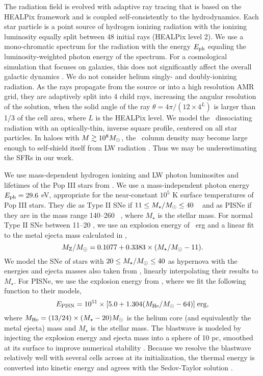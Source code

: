 \documentclass[apjl]{emulateapj}
\begin{document}
The radiation field is evolved with adaptive ray tracing
\citep{Abel02_RT, Wise11_Moray} that is based on the HEALPix framework
\citep{HEALPix} and is coupled self-consistently to the hydrodynamics.
Each star particle is a point source of hydrogen ionizing radiation
with the ionizing luminosity equally split between 48 initial rays
(HEALPix level 2).  We use a mono-chromatic spectrum for the radiation
with the energy $E_{\rm ph}$ equaling the luminosity-weighted photon
energy of the spectrum.  For a cosmological simulation that focuses on
galaxies, this does not significantly affect the overall galactic
dynamics \citep[see Sec. 6.3 in][]{Wise11_Moray}.  We do not consider helium
singly- and doubly-ionizing radiation.  As the rays propagate from the
source or into a high resolution AMR grid, they are adaptively split
into 4 child rays, increasing the angular resolution of the solution,
when the solid angle of the ray $\theta = 4\pi/(12 \times 4^{L})$ is
larger than 1/3 of the cell area, where $L$ is the HEALPix level.  We
model the \hh~dissociating radiation with an optically-thin, inverse
square profile, centered on all star particles.  In haloes with $M
\ga 10^8 \Ms$, the \hh~column density may become large enough to
self-shield itself from LW radiation \citep{Wise08_Gal}.  Thus we may
be underestimating the SFRs in our work.

We use mass-dependent hydrogen ionizing and LW photon luminosites and
lifetimes of the Pop III stars from \citet{Schaerer02}.  We use a
mass-independent photon energy $E_{\rm ph} = 29.6$ eV, appropriate for
the near-constant $10^5$ K surface temperatures of Pop III stars.
They die as Type II SNe if $11 \le M_\star/\Ms \le 40$
\Ms~\citep{Woosley95} and as PISNe if they are in the mass range
140--260 \Ms~\citep{Heger03}, where $M_\star$ is the stellar mass.
For normal Type II SNe between 11--20 \Ms, we use an explosion energy
of ~erg and a linear fit to the metal ejecta mass calculated
in \citet{Nomoto06},
%
\begin{equation}
  \label{eqn:typeii}
  M_{\rm Z}/\Ms = 0.1077 + 0.3383 \times (M_\star/\Ms - 11).
\end{equation}
%
We model the SNe of stars with $20 \le M_\star/\Ms \le 40$ as
hypernova with the energies and ejecta masses also taken from
\citeauthor{Nomoto06}, linearly interpolating their results to
$M_\star$.  For PISNe, we use the explosion energy from
\citet{Heger02}, where we fit the following function to their models,
%
\begin{equation}
  \label{eqn:pisn}
  E_{\rm PISN} = 10^{51} \times [5.0 + 1.304 (M_{\rm He}/\Ms - 64)] \; \mathrm{erg},
\end{equation}
%
where $M_{\rm He} = (13/24) \times (M_\star - 20) \Ms$ is the helium
core (and equivalently the metal ejecta) mass and $M_\star$ is the
stellar mass.  The blastwave is modeled by injecting the explosion
energy and ejecta mass into a sphere of 10 pc, smoothed at its surface
to improve numerical stability \citep{Wise08_Gal}.  Because we resolve
the blastwave relatively well with several cells across at its
initialization, the thermal energy is converted into kinetic energy
and agrees with the Sedov-Taylor solution \citep[e.g.][]{Greif07}.
\end{document}
